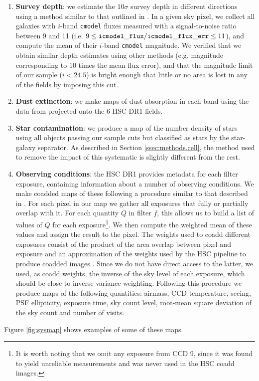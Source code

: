 \documentclass[a4paper,11pt]{article}
\begin{document}
    \begin{enumerate}
      \item {\bf Survey depth}: we estimate the $10\sigma$ survey depth in different directions using a method similar to that outlined in \cite{2018PASJ...70S..25M}. In a given sky pixel, we collect all galaxies with $i$-band {\tt cmodel} fluxes measured with a signal-to-noise ratio between 9 and 11 (i.e. $9\le{\tt icmodel\_flux}/{\tt icmodel\_flux\_err}\le11$), and compute the mean of their $i$-band  {\tt cmodel} magnitude. We verified that we obtain similar depth estimates using other methods (e.g. magnitude corresponding to $10$ times the mean flux error), and that the magnitude limit of our sample ($i<24.5$) is bright enough that little or no area is lost in any of the fields by imposing this cut.
      \item {\bf Dust extinction}: we make maps of dust absorption in each band using the data from \cite{1998ApJ...500..525S} projected onto the 6 HSC DR1 fields.
      \item {\bf Star contamination}: we produce a map of the number density of stars using all objects passing our sample cuts but classified as stars by the star-galaxy separator. As described in Section \ref{ssec:methods.cell}, the method used to remove the impact of this systematic is slightly different from the rest.
      \item {\bf Observing conditions}: the HSC DR1 provides metadata for each filter exposure, containing information about a number of observing conditions. We make coadded maps of these following a procedure similar to that described in \cite{2016ApJS..226...24L}. For each pixel in our map we gather all exposures that fully or partially overlap with it. For each quantity $Q$ in filter $f$, this allows us to build a list of values of $Q$ for each exposure\footnote{It is worth noting that we omit any exposure from CCD 9, since it was found to yield unreliable measurements and was never used in the HSC coadd images.}. We then compute the weighted mean of these values and assign the result to the pixel. The weights used to coadd different exposures consist of the product of the area overlap between pixel and exposure and an approximation of the weights used by the HSC pipeline to produce coadded images \cite{2018PASJ...70S...5B}. Since we do not have direct access to the latter, we used, as coadd weights, the inverse of the sky level of each exposure, which should be close to inverse-variance weighting. Following this procedure we produce maps of the following quantities: airmass, CCD temperature, seeing, PSF ellipticity, exposure time, sky count level, root-mean square deviation of the sky count and number of visits.
    \end{enumerate}
    Figure \ref{fig:sysmap} shows examples of some of these maps.
    
\end{document}
